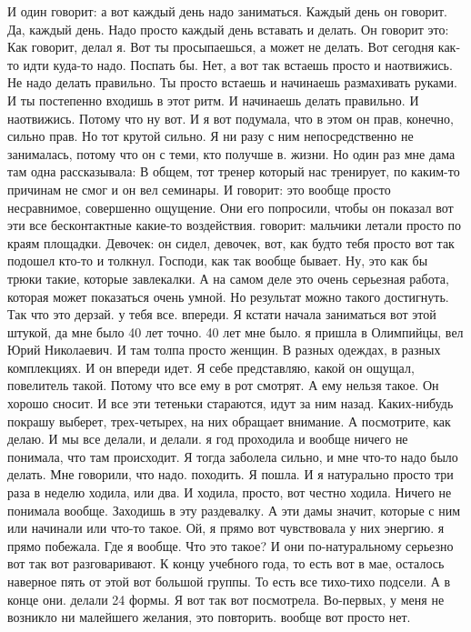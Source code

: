 И один говорит: а вот каждый день надо заниматься.
Каждый день он говорит.
Да, каждый день.
Надо просто каждый день вставать и делать.
Он говорит это:
Как говорит, делал я.
Вот ты просыпаешься, а может не делать.
Вот сегодня как-то идти куда-то надо.
Поспать бы.
Нет, а вот так встаешь просто и наотвижись.
Не надо делать правильно.
Ты просто встаешь и начинаешь размахивать руками.
И ты постепенно входишь в этот ритм.
И начинаешь делать правильно.
И наотвижись.
Потому что ну вот.
И я вот подумала, что в этом он прав, конечно, сильно прав.
Но тот крутой сильно.
Я ни разу с ним непосредственно не занималась, потому что он
с теми, кто получше в.
жизни.
Но один раз мне дама там одна рассказывала:
В общем, тот тренер который нас тренирует, по каким-то причинам не смог и он вел семинары.
И говорит: это вообще просто несравнимое, совершенно ощущение.
Они его попросили, чтобы он показал вот эти все бесконтактные какие-то воздействия.
говорит: мальчики летали просто по краям площадки.
Девочек: он сидел, девочек, вот, как будто тебя просто вот так подошел кто-то и толкнул.
Господи, как так вообще бывает.
Ну, это как бы трюки такие, которые завлекалки.
А на самом деле это очень серьезная работа, которая может показаться очень умной.
Но результат можно такого достигнуть.
Так что это дерзай.
у тебя все.
впереди.
Я кстати начала заниматься вот этой штукой, да мне было 40 лет точно.
40 лет мне было. я пришла в Олимпийцы, вел Юрий Николаевич.
И там толпа просто женщин.
В разных одеждах, в разных комплекциях.
И он впереди идет.
Я себе представляю, какой он ощущал, повелитель такой.
Потому что все ему в рот смотрят.
А ему нельзя такое.
Он хорошо сносит.
И все эти тетеньки стараются, идут за ним назад.
Каких-нибудь покрашу выберет, трех-четырех, на них обращает внимание.
А посмотрите, как делаю.
И мы все делали, и делали. я год проходила и вообще ничего не понимала, что там происходит.
Я тогда заболела сильно, и мне что-то надо было делать.
Мне говорили, что надо.
походить.
Я пошла.
И я натурально просто три раза в неделю ходила, или два.
И ходила, просто, вот честно ходила.
Ничего не понимала вообще.
Заходишь в эту раздевалку.
А эти дамы значит, которые с ним или начинали или что-то такое.
Ой, я прямо вот чувствовала у них энергию. я прямо побежала.
Где я вообще.
Что это такое?
И они по-натуральному серьезно вот так вот разговаривают.
К концу учебного года, то есть вот в мае, осталось наверное пять от этой вот большой группы.
То есть все тихо-тихо подсели.
А в конце они.
делали 24 формы.
Я вот так вот посмотрела.
Во-первых, у меня не возникло ни малейшего желания, это повторить. вообще вот просто нет.
